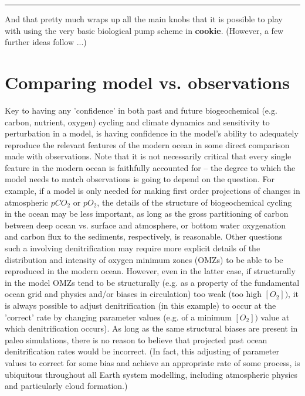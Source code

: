 \vspace{1mm} \noindent\rule{4cm}{0.5pt} \vspace{2mm}

\noindent And that pretty much wraps up all the main knobs that it is possible to play with using the very basic biological pump scheme in \textbf{cookie}. (However, a few further ideas follow ...)

\newpage

\section{Comparing model vs. observations}

Key  to having any 'confidence' in both past and future biogeochemical (e.g. carbon, nutrient, oxygen) cycling and climate dynamics and sensitivity to perturbation in a model, is having confidence in the model's ability to adequately reproduce the relevant features of the modern ocean in some direct comparison made with observations. Note that it is not necessarily critical that every single feature in the modern ocean is faithfully accounted for -- the degree to which the model needs  to match observations is going to depend on the question. For example, if a model is only needed for making first order projections of changes in atmospheric \(pCO_{2}\) or \(pO_{2}\), the details of the structure of biogeochemical cycling in the ocean may be less important, as long as the gross partitioning of carbon between deep ocean vs. surface and atmosphere, or  bottom water oxygenation and carbon flux to the sediments, respectively, is reasonable. Other questions such a involving denitrification may require more explicit details of the distribution and intensity of oxygen minimum zones (OMZs) to be able to be reproduced in the modern ocean. However, even in the latter case, if structurally in the model OMZs tend to be structurally (e.g. as a property of the fundamental ocean grid and physics and/or biases in circulation) too weak (too high \([O_{2}])\), it is always possible to adjust denitrification (in this example) to occur at the 'correct' rate by changing parameter values (e.g. of a minimum \([O_{2}])\) value at which denitrification occurs). As long as the same structural biases are present in paleo simulations, there is no reason to believe that projected past ocean denitrification rates would be incorrect. (In fact, this adjusting of parameter values to correct for some bias and achieve an appropriate rate of some process, is ubiquitous throughout all Earth system modelling, including atmospheric physics and particularly cloud formation.)

